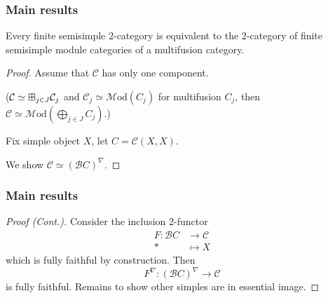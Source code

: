 \documentclass{beamer}
\DeclareMathOperator{\id}{id}
\newcommand{\cB}{{\mathcal{B}}}
\newcommand{\cC}{{\mathcal{C}}}
\newcommand{\bigboxplus}{\Huge \boxplus}
\newcommand{\Mod}{{\mathcal{M}\textrm{od}}}
\newcommand{\ModA}[1]{{\Mod(#1)}}
\begin{document}
%
%

\begin{frame}
\frametitle{Main results}

\begin{theorem}
Every finite semisimple 2-category is equivalent to
the 2-category of finite semisimple module categories
of a multifusion category.
\end{theorem}

\begin{proof}\renewcommand{\qedsymbol}{}
Assume that $\cC$ has only one component.

\pause
($\cC \simeq \bigboxplus_{j \in J} \cC_j$
and $\cC_j \simeq \ModA{C_j}$ for multifusion $C_j$,
then $\cC \simeq \ModA{\bigoplus_{j \in J} C_j}$.)

\pause
Fix simple object $X$, let $C = \cC(X,X)$.
\pause

We show $\cC \simeq (\cB C)^\nabla$.

\end{proof}

\end{frame}

\begin{frame}
\frametitle{Main results}

\begin{proof}[Proof (Cont.)]\renewcommand{\qedsymbol}{}

Consider the inclusion 2-functor
\begin{align*}
F : \cB C &\to \cC
\\
* &\mapsto X
\end{align*}
which is fully faithful by construction.
\pause
Then
\[
F^\nabla: (\cB C)^\nabla \to \cC
\]
is fully faithful.
\pause
Remains to show other simples are in essential image.

\end{proof}

\end{frame}
\end{document}
